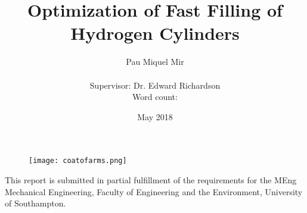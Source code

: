 \documentclass[11pt, twoside, draft]{article}
\begin{document}


\title{Optimization of Fast Filling of Hydrogen Cylinders}
\author{
\vspace{0.1cm}
Pau Miquel Mir\\
\vspace{0.1cm}
\candidatenum \\
Supervisor: Dr. Edward Richardson\\
Word count: \\
}

\date{May 2018}

\maketitle

\begin{figure}[htbp]
\begin{center}
\texttt{[image: coatofarms.png]}
\end{center}
\end{figure}

\begin{center}
\large
This report is submitted in partial fulfillment of the requirements
for the MEng Mechanical Engineering, Faculty of Engineering and the
Environment, University of Southampton.
\end{center}

\cleardoublepage


\end{document}
